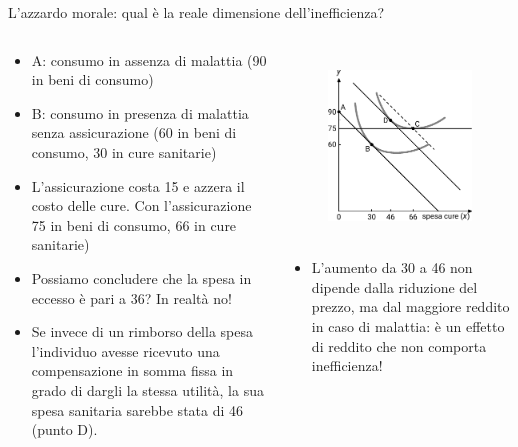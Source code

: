 \documentclass[aspectratio=64,11pt]{beamer}
\begin{document}
\begin{frame}{L'azzardo morale: qual è la reale dimensione dell'inefficienza?}
\begin{columns}
\begin{column}{.5\columnwidth}
\small
\begin{itemize}
\item A: consumo in assenza di malattia (90 in beni di consumo)
\item B: consumo in presenza di malattia senza assicurazione (60 in beni di
consumo, 30 in cure sanitarie)
\item L'assicurazione costa 15 e azzera il costo delle cure. Con l'assicurazione
75 in beni di consumo, 66 in cure sanitarie)
\item Possiamo concludere che la spesa in eccesso è pari a 36? In realtà no!
\item Se invece di un rimborso della spesa l'individuo avesse ricevuto una
compensazione in somma fissa in grado di dargli la stessa utilità, la sua
spesa sanitaria sarebbe stata di 46 (punto D).
\end{itemize}
\end{column}

\begin{column}{.5\columnwidth}
\begin{figure}[htbp]
\centering
\includegraphics[height=5cm]{./figure/moral-hazard-effetto-reddito.pdf}
\end{figure}    
\small
\begin{itemize}
\item L'aumento da 30 a 46 non dipende dalla riduzione del prezzo, ma dal
maggiore reddito in caso di malattia: è un effetto di reddito che non comporta inefficienza!
\end{itemize}
\end{column}
\end{columns}
\end{frame}
\end{document}
